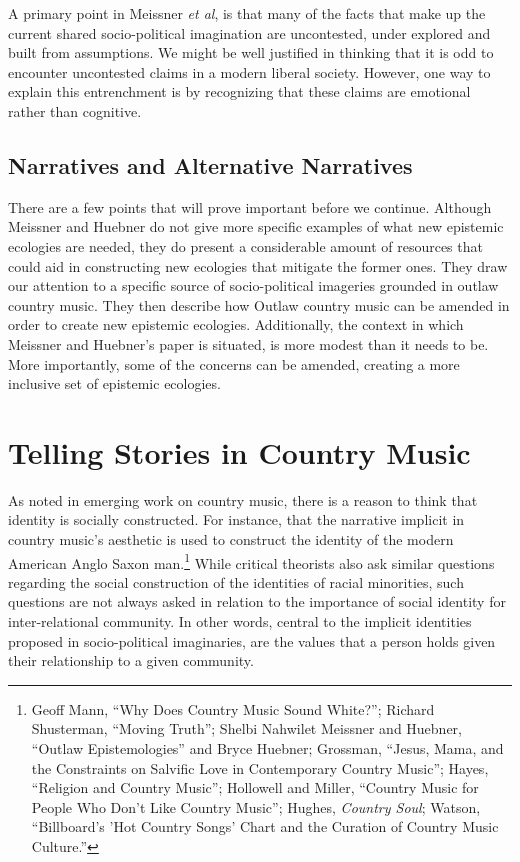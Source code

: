 \documentclass[phdthesis,12pt,final]{wuthesis}
\theoremstyle{definition}
\theoremstyle{definition}
\theoremstyle{definition}
\theoremstyle{definition}
\theoremstyle{remark}
\begin{document}
A primary point in Meissner \emph{et al}, is that many of the facts that make up the current shared socio-political imagination are uncontested, under explored and built from assumptions. We might be well justified in thinking that it is odd to encounter uncontested claims in a modern liberal society. However, one way to explain this entrenchment is by recognizing that these claims are emotional rather than cognitive.

\subsection*{Narratives and Alternative Narratives}\label{narratives-and-alternative-narratives}

There are a few points that will prove important before we continue. Although Meissner and Huebner do not give more specific examples of what new epistemic ecologies are needed, they do present a considerable amount of resources that could aid in constructing new ecologies that mitigate the former ones. They draw our attention to a specific source of socio-political imageries grounded in outlaw country music. They then describe how Outlaw country music can be amended in order to create new epistemic ecologies. Additionally, the context in which Meissner and Huebner's paper is situated, is more modest than it needs to be. More importantly, some of the concerns can be amended, creating a more inclusive set of epistemic ecologies.

\section{Telling Stories in Country Music}\label{telling-stories-in-country-music}

As noted in emerging work on country music, there is a reason to think that identity is socially constructed. For instance, that the narrative implicit in country music's aesthetic is used to construct the identity of the modern American Anglo Saxon man.\footnote{Geoff Mann, {``Why Does Country Music Sound White?''}; Richard Shusterman, {``Moving {Truth}''}; Shelbi Nahwilet Meissner and Huebner, {``Outlaw Epistemologies''} and Bryce Huebner; Grossman, {``Jesus, {Mama}, and the {Constraints} on {Salvific Love} in {Contemporary Country Music}''}; Hayes, {``Religion and {Country Music}''}; Hollowell and Miller, {``Country {Music} for {People Who Don}'t {Like Country Music}''}; Hughes, \emph{Country Soul}; Watson, {``Billboard's '{Hot Country Songs}' Chart and the Curation of Country Music Culture.''}} While critical theorists also ask similar questions regarding the social construction of the identities of racial minorities, such questions are not always asked in relation to the importance of social identity for inter-relational community. In other words, central to the implicit identities proposed in socio-political imaginaries, are the values that a person holds given their relationship to a given community.
\end{document}
